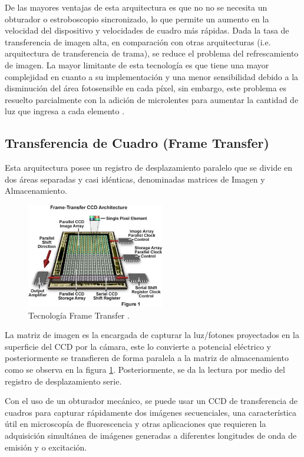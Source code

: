 \documentclass[conference]{IEEEtran}
\begin{document}
De las mayores ventajas de esta arquitectura es que no no se necesita un obturador o estroboscopio sincronizado, lo que permite un aumento en la velocidad del dispositivo y velocidades de cuadro más rápidas. Dada la tasa de transferencia de imagen alta, en comparación con otras arquitecturas  (i.e. arquitectura de transferencia de trama), se reduce el problema del refrescamiento de imagen. La mayor limitante de esta tecnología es que tiene una mayor complejidad en cuanto a su implementación y una menor sensibilidad debido a la disminución del área fotosensible en cada píxel, sin embargo, este problema es resuelto parcialmente con la adición de microlentes para aumentar la cantidad de luz que ingresa a cada elemento \cite{IL_CCD1}.

\subsection{\textbf{Transferencia de Cuadro (Frame Transfer)}}
Esta arquitectura posee un registro de desplazamiento paralelo que se divide en dos áreas separadas y casi idénticas, denominadas matrices de Imagen y Almacenamiento.

\begin{figure}[H]
\centering
\includegraphics[width=6cm]{ft_ccd}
\caption{Tecnología Frame Transfer \cite{ft_ccd}.}
\label{ft_ccd}
\end{figure}

La matriz de imagen es la encargada de capturar la luz/fotones proyectados en la superficie del CCD por la cámara, este lo convierte a potencial eléctrico y posteriormente se transfieren de forma paralela a la matriz de almacenamiento como se observa en la figura \ref{ft_ccd}. Posteriormente, se da la lectura por medio del registro de desplazamiento serie.

Con el uso de un obturador mecánico, se puede usar un CCD de transferencia de cuadros para capturar rápidamente dos imágenes secuenciales, una característica útil en microscopía de fluorescencia y otras aplicaciones que requieren la adquisición simultánea de imágenes generadas a diferentes longitudes de onda de emisión y o excitación\cite{ft_ccd}.
\end{document}
